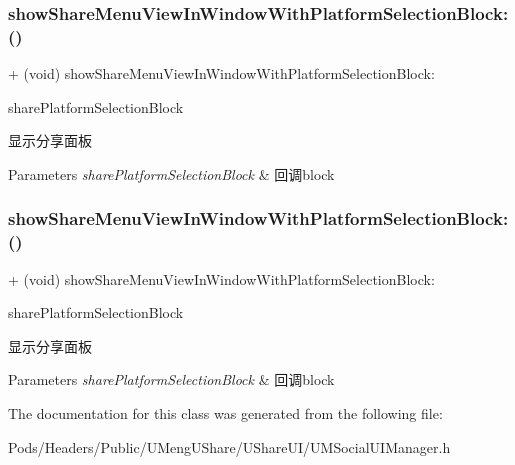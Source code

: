 \subsubsection{\texorpdfstring{show\+Share\+Menu\+View\+In\+Window\+With\+Platform\+Selection\+Block\+:()}{showShareMenuViewInWindowWithPlatformSelectionBlock:()}\hspace{0.1cm}{\footnotesize\ttfamily [1/2]}}
{\footnotesize\ttfamily + (void) show\+Share\+Menu\+View\+In\+Window\+With\+Platform\+Selection\+Block\+: \begin{DoxyParamCaption}\item[{(U\+M\+Social\+Share\+Platform\+Selection\+Block)}]{share\+Platform\+Selection\+Block }\end{DoxyParamCaption}}

显示分享面板


\begin{DoxyParams}{Parameters}
{\em share\+Platform\+Selection\+Block} & 回调block \\
\hline
\end{DoxyParams}
\mbox{\label{interface_u_m_social_u_i_manager_a933b1aa08644baf6edc5c66bf5243d2e}} 
\subsubsection{\texorpdfstring{show\+Share\+Menu\+View\+In\+Window\+With\+Platform\+Selection\+Block\+:()}{showShareMenuViewInWindowWithPlatformSelectionBlock:()}\hspace{0.1cm}{\footnotesize\ttfamily [2/2]}}
{\footnotesize\ttfamily + (void) show\+Share\+Menu\+View\+In\+Window\+With\+Platform\+Selection\+Block\+: \begin{DoxyParamCaption}\item[{(U\+M\+Social\+Share\+Platform\+Selection\+Block)}]{share\+Platform\+Selection\+Block }\end{DoxyParamCaption}}

显示分享面板


\begin{DoxyParams}{Parameters}
{\em share\+Platform\+Selection\+Block} & 回调block \\
\hline
\end{DoxyParams}


The documentation for this class was generated from the following file\+:\begin{DoxyCompactItemize}
\item 
Pods/\+Headers/\+Public/\+U\+Meng\+U\+Share/\+U\+Share\+U\+I/U\+M\+Social\+U\+I\+Manager.\+h\end{DoxyCompactItemize}
